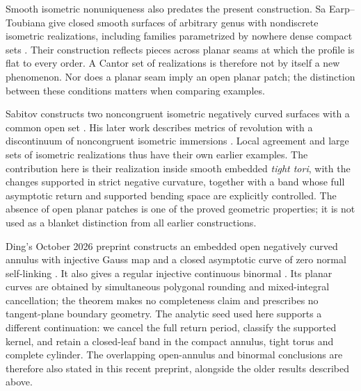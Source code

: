 \documentclass[11pt]{amsart}
\theoremstyle{definition}
\theoremstyle{remark}
\numberwithin{equation}{section}
\begin{document}
Smooth isometric nonuniqueness also predates the present construction.
Sa Earp--Toubiana give closed smooth surfaces of arbitrary genus with
nondiscrete isometric realizations, including families parametrized by
nowhere dense compact sets \cite[Theorem~2]{SaEarpToubiana}. Their
construction reflects pieces across planar seams at which the profile
is flat to every order. A Cantor set of realizations is therefore not
by itself a new phenomenon. Nor does a planar seam imply an open
planar patch; the distinction between these conditions matters when
comparing examples.

Sabitov constructs two noncongruent isometric negatively curved
surfaces with a common open set \cite{Sabitov2018}. His later work
describes metrics of revolution with a discontinuum of noncongruent
isometric immersions \cite{Sabitov2021}. Local agreement and large
sets of isometric realizations thus have their own earlier examples.
The contribution here is their realization inside smooth embedded
\emph{tight tori}, with the changes supported in strict negative
curvature, together with a band whose full asymptotic return and
supported bending space are explicitly controlled. The absence of
open planar patches is one of the proved geometric properties;
it is not used as a blanket distinction from all earlier constructions.

Ding's October 2026 preprint constructs an embedded open negatively
curved annulus with injective Gauss map and a closed asymptotic curve
of zero normal self-linking \cite[Theorem~1.1]{Ding2026}. It also gives
a regular injective continuous binormal \cite[Corollary~1.2]{Ding2026}.
Its planar curves are obtained by simultaneous polygonal rounding and
mixed-integral cancellation; the theorem makes no completeness claim
and prescribes no tangent-plane boundary geometry. The analytic seed
used here supports a different continuation: we cancel the full return
period, classify the supported kernel, and retain a closed-leaf band in
the compact annulus, tight torus and complete cylinder. The overlapping
open-annulus and binormal conclusions are therefore also stated in
this recent preprint, alongside the older results described above.
\end{document}
